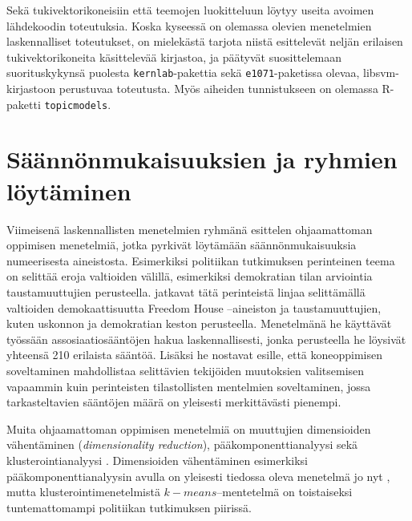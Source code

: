 \documentclass[finnish,gradu,twoside,12pt]{tktltiki}
\begin{document}
{Sekä tukivektorikoneisiin että teemojen luokitteluun löytyy useita avoimen lähdekoodin toteutuksia. Koska kyseessä on olemassa olevien menetelmien laskennalliset toteutukset, on mielekästä tarjota niistä  \citet{hornik2006support} esittelevät neljän erilaisen tukivektorikoneita käsittelevää kirjastoa, ja päätyvät suosittelemaan suorituskykynsä puolesta \texttt{kernlab}-pakettia sekä \texttt{e1071}-paketissa olevaa, libsvm-kirjastoon perustuvaa toteutusta. Myös aiheiden tunnistukseen on olemassa R-paketti \texttt{topicmodels}.

\section{Säännönmukaisuuksien ja ryhmien löytäminen}
\label{unsupervised}

Viimeisenä laskennallisten menetelmien ryhmänä esittelen ohjaamattoman oppimisen menetelmiä, jotka pyrkivät löytämään säännönmukaisuuksia numeerisesta aineistosta. Esimerkiksi politiikan tutkimuksen perinteinen teema on selittää eroja valtioiden välillä, esimerkiksi demokratian tilan arviointia taustamuuttujien perusteella. \citet{Jurek2013} jatkavat tätä perinteistä linjaa selittämällä valtioiden demokaattisuutta Freedom House --aineiston ja taustamuuttujien, kuten uskonnon ja demokratian keston perusteella. Menetelmänä he käyttävät työssään assosiaatiosääntöjen hakua laskennallisesti, jonka perusteella he löysivät yhteensä 210 erilaista sääntöä. Lisäksi he nostavat esille, että koneoppimisen soveltaminen mahdollistaa selittävien tekijöiden muutoksien valitsemisen vapaammin kuin perinteisten tilastollisten mentelmien soveltaminen, jossa tarkasteltavien sääntöjen määrä on yleisesti merkittävästi pienempi.

Muita ohjaamattoman oppimisen menetelmiä on muuttujien dimensioiden vähentäminen (\textit{dimensionality reduction}), pääkomponenttianalyysi sekä klusterointianalyysi \citet[485--586]{Hastie2009}. Dimensioiden vähentäminen esimerkiksi pääkomponenttianalyysin avulla on yleisesti tiedossa oleva menetelmä jo nyt \citep[esimerkiksi][615--651]{metsamuuronen}, mutta klusterointimenetelmistä $k-means$--mentetelmä on toistaiseksi tuntemattomampi politiikan tutkimuksen piirissä.




}
\end{document}
